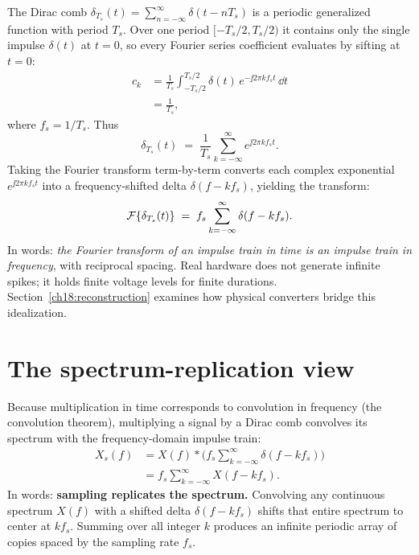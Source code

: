 \begin{formalbox}
The Dirac comb $\delta_{T_s}(t) = \sum_{n=-\infty}^\infty \delta(t-nT_s)$ is a
periodic generalized function with period $T_s$. Over one period $[-T_s/2, T_s/2)$ it contains only the single impulse $\delta(t)$ at $t=0$, so every Fourier series coefficient evaluates by sifting at $t=0$:
\begin{align*}
  c_k &= \frac{1}{T_s}\int_{-T_s/2}^{T_s/2}\delta(t)\,e^{-\jj 2\pi k f_s t}\,\dd t \\
      &= \frac{1}{T_s},
\end{align*}
where $f_s = 1/T_s$. Thus
\[
  \delta_{T_s}(t) \;=\; \frac{1}{T_s}\sum_{k=-\infty}^\infty e^{\jj 2\pi k f_s t}.
\]
Taking the Fourier transform term-by-term converts each complex
exponential $e^{\jj 2\pi k f_s t}$ into a frequency-shifted delta $\delta(f - k f_s)$,
yielding the transform:
\[
  \mathcal{F}\{\delta_{T_s}(t)\} \;=\; f_s \sum_{k=-\infty}^\infty \delta(f - k f_s).
\]
In words: \emph{the Fourier transform of an impulse train in time is an impulse train
in frequency}, with reciprocal spacing. Real hardware does not generate infinite spikes;
it holds finite voltage levels for finite durations. Section~\ref{ch18:reconstruction}
examines how physical converters bridge this idealization.
\end{formalbox}

\section{The spectrum-replication view}
\label{ch18:replication}

Because multiplication in time corresponds to
convolution in frequency (the convolution theorem), multiplying a signal by a Dirac
comb convolves its spectrum with the frequency-domain impulse train:
\begin{align*}
  X_s(f) &= X(f) * \Big(f_s \sum_{k=-\infty}^{\infty} \delta(f - k f_s)\Big) \\
         &= f_s \sum_{k=-\infty}^{\infty} X(f - k f_s).
\end{align*}
In words: \textbf{sampling replicates the spectrum.} Convolving any continuous
spectrum $X(f)$ with a shifted delta $\delta(f - k f_s)$ shifts that entire spectrum
to center at $k f_s$. Summing over all integer $k$ produces an infinite periodic
array of copies spaced by the sampling rate $f_s$.

